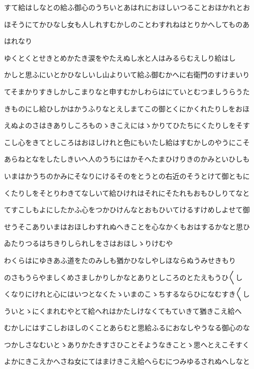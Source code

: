\documentclass[a4paper,11pt,landscape]{ltjtarticle}
\begin{document}
\par\medskip
すて給はしなとの給ふ御心のうちいとあはれにおほしいつることおほかれとお
\par\medskip
ほそうにてかひなし女も人しれすむかしのことわすれねはとりかへしてものあ
\par\medskip
はれなり
\par\medskip
ゆくとくとせきとめかたき涙をやたえぬし水と人はみるらむえしり給はし
\par\medskip
かしと思ふにいとかひなしいし山よりいて給ふ御むかへに右衛門のすけまいり
\par\medskip
てそまかりすきしかしこまりなと申すむかしわらはにていとむつましうらうた
\par\medskip
きものにし給ひしかはかうふりなとえしまてこの御とくにかくれたりしをおほ
\par\medskip
えぬよのさはきありしころものゝきこえにはゝかりてひたちにくたりしをそす
\par\medskip
こし心をきてとしころはおほしけれと色にもいたし給はすむかしのやうにこそ
\par\medskip
あらねとなをしたしきいへ人のうちにはかそへたまひけりきのかみといひしも
\par\medskip
いまはかうちのかみにそなりにけるそのをとうとの右近のそうとけて御ともに
\par\medskip
くたりしをそとりわきてなしいて給ひけれはそれにそたれもおもひしりてなと
\par\medskip
てすこしもよにしたかふ心をつかひけんなとおもひいてけるすけめしよせて御
\par\medskip
せうそこありいまはおほしわすれぬへきことを心なかくもおはするかなと思ひ
\par\medskip
ゐたりつるはちきりしられしをさはおほしゝりけむや
\par\medskip
わくらはにゆきあふ道をたのみしも猶かひなしやしほならぬうみせきもり
\par\medskip
のさもうらやましくめさましかりしかなとありとしころのとたえもうひ〱し
\par\medskip
くなりにけれと心にはいつとなくたゝいまのこゝちするならひになむすき〱し
\par\medskip
ういとゝにくまれむやとて給へれはかたしけなくてもていきて猶きこえ給へ
\par\medskip
むかしにはすこしおほしのくことあらむと思給ふるにおなしやうなる御心のな
\par\medskip
つかしさなむいとゝありかたきすさひことそようなきことゝ思へとえこそすく
\par\medskip
よかにきこえかへさね女にてはまけきこえ給へらむにつみゆるされぬへしなと
\end{document}
